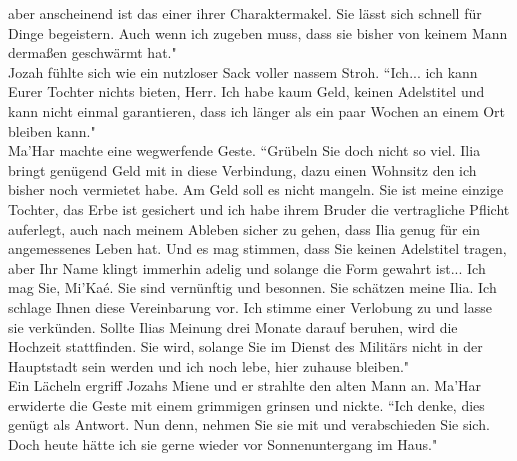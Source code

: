 aber anscheinend ist das einer ihrer Charaktermakel. Sie lässt sich schnell für Dinge begeistern. 
Auch wenn ich zugeben muss, dass sie bisher von keinem Mann dermaßen geschwärmt hat."\\
Jozah fühlte sich wie ein nutzloser Sack voller nassem Stroh.  ``Ich... ich kann Eurer Tochter 
nichts bieten, Herr. Ich habe kaum Geld, keinen Adelstitel und kann nicht einmal garantieren, dass 
ich länger als ein paar Wochen an einem Ort bleiben kann."\\
Ma'Har machte eine wegwerfende Geste.  ``Grübeln Sie doch nicht so viel. Ilia bringt genügend Geld 
mit in diese Verbindung, dazu einen Wohnsitz den ich bisher noch vermietet habe. Am Geld soll es 
nicht mangeln. Sie ist meine einzige Tochter, das Erbe ist gesichert und ich habe ihrem Bruder die 
vertragliche Pflicht auferlegt, auch nach meinem Ableben sicher zu gehen, dass Ilia genug für ein 
angemessenes Leben hat. Und es mag stimmen, dass Sie keinen Adelstitel tragen, aber Ihr Name klingt 
immerhin adelig und solange die Form gewahrt ist... Ich mag Sie, Mi'Kaé. Sie sind vernünftig und 
besonnen. Sie schätzen meine Ilia. Ich schlage Ihnen diese Vereinbarung vor. Ich stimme einer 
Verlobung zu und lasse sie verkünden. Sollte Ilias Meinung drei Monate darauf beruhen, wird die 
Hochzeit stattfinden. Sie wird, solange Sie im Dienst des Militärs nicht in der Hauptstadt sein 
werden und ich noch lebe, hier zuhause bleiben."\\
Ein Lächeln ergriff Jozahs Miene und er strahlte den alten Mann an. Ma'Har erwiderte die Geste mit 
einem grimmigen grinsen und nickte.  ``Ich denke, dies genügt als Antwort. Nun denn, nehmen Sie sie 
mit und verabschieden Sie sich. Doch heute hätte ich sie gerne wieder vor Sonnenuntergang im 
Haus."\\

